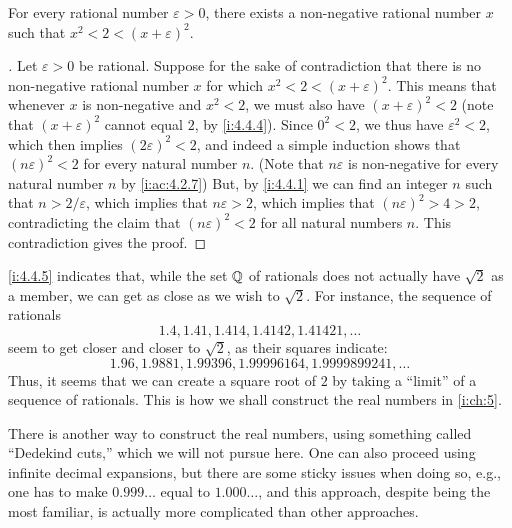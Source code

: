 \begin{prop}\label{i:4.4.5}
  For every rational number \(\varepsilon > 0\), there exists a non-negative rational number \(x\) such that \(x^2 < 2 < (x + \varepsilon)^2\).
\end{prop}

\begin{proof}[]
  Let \(\varepsilon > 0\) be rational.
  Suppose for the sake of contradiction that there is no non-negative rational number \(x\) for which \(x^2 < 2 < (x + \varepsilon)^2\).
  This means that whenever \(x\) is non-negative and \(x^2 < 2\), we must also have \((x + \varepsilon)^2 < 2\)
  (note that \((x + \varepsilon)^2\) cannot equal \(2\), by \cref{i:4.4.4}).
  Since \(0^2 < 2\), we thus have \(\varepsilon^2 < 2\), which then implies \((2\varepsilon)^2 < 2\), and indeed a simple induction shows that \((n\varepsilon)^2 < 2\) for every natural number \(n\).
  (Note that \(n\varepsilon\) is non-negative for every natural number \(n\) by \cref{i:ac:4.2.7})
  But, by \cref{i:4.4.1} we can find an integer \(n\) such that \(n > 2 / \varepsilon\), which implies that \(n\varepsilon > 2\), which implies that \((n\varepsilon)^2 > 4 > 2\), contradicting the claim that \((n\varepsilon)^2 < 2\) for all natural numbers \(n\).
  This contradiction gives the proof.
\end{proof}

\begin{note}
  \cref{i:4.4.5} indicates that, while the set \(\mathbb{Q}\) of rationals does not actually have \(\sqrt{2}\) as a member, we can get as close as we wish to \(\sqrt{2}\).
  For instance, the sequence of rationals
  \[
    1.4, 1.41, 1.414, 1.4142, 1.41421, \dots
  \]
  seem to get closer and closer to \(\sqrt{2}\), as their squares indicate:
  \[
    1.96, 1.9881, 1.99396, 1.99996164, 1.9999899241, \dots
  \]
  Thus, it seems that we can create a square root of \(2\) by taking a ``limit'' of a sequence of rationals.
  This is how we shall construct the real numbers in \cref{i:ch:5}.
\end{note}

\begin{note}
  There is another way to construct the real numbers, using something called ``Dedekind cuts,'' which we will not pursue here.
  One can also proceed using infinite decimal expansions, but there are some sticky issues when doing so, e.g., one has to make \(0.999\dots\) equal to \(1.000\dots\), and this approach, despite being the most familiar, is actually more complicated than other approaches.
\end{note}


